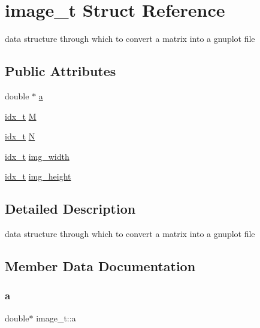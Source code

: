 \hypertarget{structimage__t}{}\section{image\+\_\+t Struct Reference}
\label{structimage__t}


data structure through which to convert a matrix into a gnuplot file  


\subsection*{Public Attributes}
\begin{DoxyCompactItemize}
\item 
double $\ast$ \hyperlink{structimage__t_a2d2352a1d6c74a0df52a695bb3933d76}{a}
\item 
\hyperlink{spmv_8cc_a8e93478a00e685bea5e6a3f617bf03a3}{idx\+\_\+t} \hyperlink{structimage__t_a9ee57eb792a8c6bd1cd79efa329c728d}{M}
\item 
\hyperlink{spmv_8cc_a8e93478a00e685bea5e6a3f617bf03a3}{idx\+\_\+t} \hyperlink{structimage__t_ac6fdcfae13f4b5eccac7e9ef12502d64}{N}
\item 
\hyperlink{spmv_8cc_a8e93478a00e685bea5e6a3f617bf03a3}{idx\+\_\+t} \hyperlink{structimage__t_ae5f65c72e35caf8e730fe7962e732b0f}{img\+\_\+width}
\item 
\hyperlink{spmv_8cc_a8e93478a00e685bea5e6a3f617bf03a3}{idx\+\_\+t} \hyperlink{structimage__t_a37efb1b675fc28e5a131dca263fd2833}{img\+\_\+height}
\end{DoxyCompactItemize}


\subsection{Detailed Description}
data structure through which to convert a matrix into a gnuplot file 

\subsection{Member Data Documentation}
\mbox{\label{structimage__t_a2d2352a1d6c74a0df52a695bb3933d76}} 
\subsubsection{\texorpdfstring{a}{a}}
{\footnotesize\ttfamily double$\ast$ image\+\_\+t\+::a}

